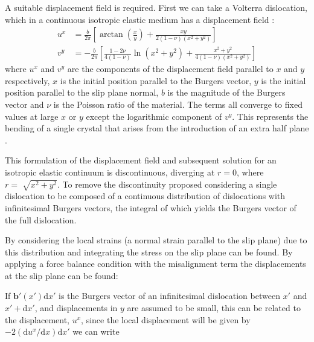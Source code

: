 A suitable displacement field is required. First we can take a Volterra dislocation, which in a continuous isotropic elastic medium has a displacement field \cite{hirth_lothe1982volterra_displacements}:
\begin{subequations}
\begin{align}
u^x &= \frac{b}{2\pi}\left[ \arctan\left(\frac{x}{y}\right) + \frac{xy}{2(1-\nu)(x^2 + y^2)} \right] \\[0.5ex]
v^y &= -\frac{b}{2\pi} \left[ \frac{1-2\nu}{4(1-\nu)} \ln(x^2 + y^2) + \frac{x^2 + y^2}{4(1-\nu)(x^2 + y^2)} \right]
\end{align}
\end{subequations}
where $u^x$ and $v^y$ are the components of the displacement field parallel to $x$ and $y$ respectively, $x$ is the initial position parallel to the Burgers vector, $y$ is the initial position parallel to the slip plane normal, $b$ is the magnitude of the Burgers vector and $\nu$ is the Poisson ratio of the material. The terms all converge to fixed values at large $x$ or $y$ except the logarithmic component of $v^y$. This represents the bending of a single crystal that arises from the introduction of an extra half plane \cite{hirth_lothe1982volterra_displacements}.

This formulation of the displacement field and subsequent solution for an isotropic elastic continuum is discontinuous, diverging at $r=0$, where $r=\sqrt[]{x^2+y^2}$. To remove the discontinuity \citet{Eshelby1949} proposed considering a single dislocation to be composed of a continuous distribution of dislocations with infinitesimal Burgers vectors, the integral of which yields the Burgers vector of the full dislocation. 

By considering the local strains (a normal strain parallel to the slip plane) due to this distribution and integrating the stress on the slip plane can be found. By applying a force balance condition with the misalignment term the displacements at the slip plane can be found:


If $\bm{b}'(x')\mathrm{d}x'$ is the Burgers vector of an infinitesimal dislocation between $x'$ and $x'+\mathrm{d} x'$, and displacements in $y$ are assumed to be small, this can be related to the displacement, $u^x$, since the local displacement will be given by $-2(\mathrm{d} u^x/\mathrm{d} x)\mathrm{d} x'$ \cite{hirth_lothe1982peierls_displacements} we can write


